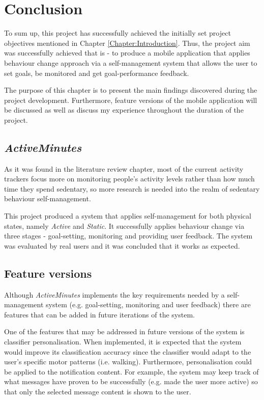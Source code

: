 \chapter{Conclusion}
To sum up, this project has successfully achieved the initially set project objectives mentioned in Chapter \ref{Chapter:Introduction}. Thus, the project aim was successfully achieved that is - to produce a mobile application that applies behaviour change approach via a self-management system that allows the user to set goals, be monitored and get goal-performance feedback. 

The purpose of this chapter is to present the main findings discovered during the project development. Furthermore, feature versions of the mobile application will be discussed as well as discuss my experience throughout the duration of the project. 

\section{\textit{ActiveMinutes}}
As it was found in the literature review chapter, most of the current activity trackers focus more on monitoring people's activity levels rather than how much time they spend sedentary, so more research is needed into the realm of sedentary behaviour self-management.

This project produced a system that applies self-management for both physical states, namely \textit{Active} and \textit{Static}. It successfully applies behaviour change via three stages - goal-setting, monitoring and providing user feedback. The system was evaluated by real users and it was concluded that it works as expected.

\section{Feature versions}
Although \textit{ActiveMinutes} implements the key requirements needed by a self-management system (e.g. goal-setting, monitoring and user feedback) there are features that can be added in future iterations of the system. 

One of the features that may be addressed in future versions of the system is classifier personalisation. When implemented, it is expected that the system would improve its classification accuracy since the classifier would adapt to the user's specific motor patterns (i.e. walking). Furthermore, personalisation could be applied to the notification content. For example, the system may keep track of what messages have proven to be successfully (e.g. made the user more active) so that only the selected message content is shown to the user.

